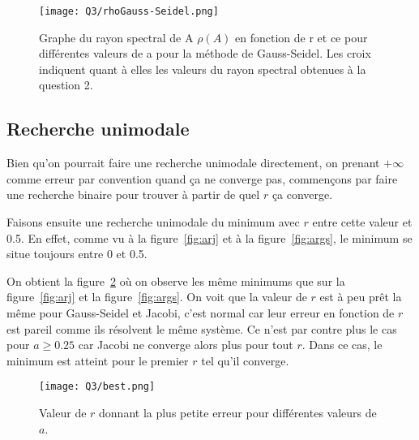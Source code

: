  \begin{figure} \label{fig:GSrayon}
  \centering
  \texttt{[image: Q3/rhoGauss-Seidel.png]}
  \caption{Graphe du rayon spectral de A $\rho(A)$ en fonction de r et ce pour différentes valeurs de a pour la méthode de Gauss-Seidel. Les croix indiquent quant à elles les valeurs du rayon spectral obtenues à la question 2.}
  \label{fig:ar}
\end{figure}

\subsection{Recherche unimodale}
Bien qu'on pourrait faire une recherche unimodale directement, on prenant
$+\infty$ comme erreur par convention quand ça ne converge pas,
commençons par faire une recherche binaire pour trouver à partir de quel
$r$ ça converge.

Faisons ensuite une recherche unimodale du minimum
avec $r$ entre cette valeur et 0.5.
En effet, comme vu à la figure~\ref{fig:arj} et à la figure~\ref{fig:args},
le minimum se situe toujours entre 0 et 0.5.

On obtient la figure~\ref{fig:best} où on observe les même minimums que sur la figure~\ref{fig:arj}
et la figure~\ref{fig:args}.
On voit que la valeur de $r$ est à peu prêt la même pour Gauss-Seidel et Jacobi,
c'est normal car leur erreur en fonction de $r$ est pareil comme ils résolvent le même système.
Ce n'est par contre plus le cas pour $a \geq 0.25$ car Jacobi ne converge alors plus pour tout $r$.
Dans ce cas, le minimum est atteint pour le premier $r$ tel qu'il converge.

\begin{figure}
  \centering
  \texttt{[image: Q3/best.png]}
  \caption{Valeur de $r$ donnant la plus petite erreur pour différentes valeurs de $a$.}
  \label{fig:best}
\end{figure}
